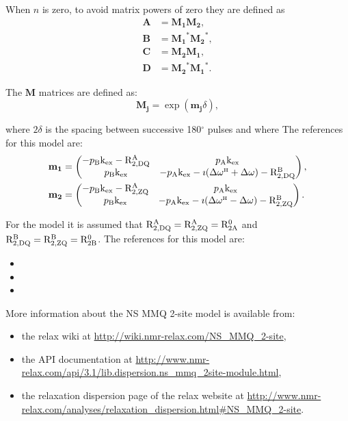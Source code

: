 When $n$ is zero, to avoid matrix powers of zero they are defined as
\begin{subequations}
\begin{align}
    \mathbf{A} &= \mathbf{M_1} \mathbf{M_2}, \\
    \mathbf{B} &= \mathbf{M_1}^* \mathbf{M_2}^*, \\
    \mathbf{C} &= \mathbf{M_2} \mathbf{M_1}, \\
    \mathbf{D} &= \mathbf{M_2}^* \mathbf{M_1}^*.
\end{align}
\end{subequations}

The $\mathbf{M}$ matrices are defined as:
\begin{equation}
    \mathbf{M_j} = \exp(\mathbf{m_j}\delta),
\end{equation}

where $2\delta$ is the spacing between successive 180$^\circ$ pulses and where
The references for this model are:
\begin{subequations}
\begin{align}
    \mathbf{m_1} &= \begin{pmatrix}
                        -p_\textrm{B}\textrm{k}_\textrm{ex} - \mathrm{R}_\mathrm{2,DQ}^\mathrm{A} & p_\textrm{A}\textrm{k}_\textrm{ex} \\
                        p_\textrm{B}\textrm{k}_\textrm{ex} & - p_\textrm{A}\textrm{k}_\textrm{ex} -\imath(\Delta\omega^{\scriptscriptstyle\mathrm{H}} + \Delta\omega) - \mathrm{R}_\mathrm{2,DQ}^\mathrm{B} 
                    \end{pmatrix}, \\
    \mathbf{m_2} &=  \begin{pmatrix}
                        -p_\textrm{B}\textrm{k}_\textrm{ex} - \mathrm{R}_\mathrm{2,ZQ}^\mathrm{A} & p_\textrm{A}\textrm{k}_\textrm{ex} \\
                        p_\textrm{B}\textrm{k}_\textrm{ex} & - p_\textrm{A}\textrm{k}_\textrm{ex} -\imath(\Delta\omega^{\scriptscriptstyle\mathrm{H}} - \Delta\omega) - \mathrm{R}_\mathrm{2,ZQ}^\mathrm{B} 
                    \end{pmatrix}.
\end{align}
\end{subequations}

For the model it is assumed that $\mathrm{R}_\mathrm{2,DQ}^\mathrm{A} = \mathrm{R}_\mathrm{2,ZQ}^\mathrm{A} = \mathrm{R}_\mathrm{2A}^0$ and $\mathrm{R}_\mathrm{2,DQ}^\mathrm{B} = \mathrm{R}_\mathrm{2,ZQ}^\mathrm{B} = \mathrm{R}_\mathrm{2B}^0$.
The references for this model are:
\begin{itemize}
  \item {}
  \item {}
  \item {}
\end{itemize}

More information about the NS MMQ 2-site model is available from:
\begin{itemize}
  \item the relax wiki at \url{http://wiki.nmr-relax.com/NS\_MMQ\_2-site},
  \item the API documentation at \url{http://www.nmr-relax.com/api/3.1/lib.dispersion.ns\_mmq\_2site-module.html},
  \item the relaxation dispersion page of the relax website at \url{http://www.nmr-relax.com/analyses/relaxation\_dispersion.html#NS\_MMQ\_2-site}.
\end{itemize}



